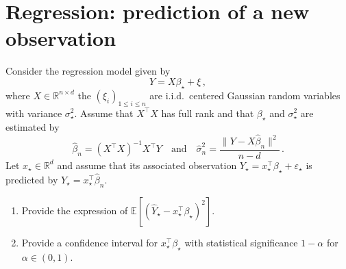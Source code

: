 \documentclass[a4paper,10pt,fleqn]{article}
\newcommand{\eqsp}{\,}
\newcommand{\rset}{\ensuremath{\mathbb{R}}}
\newcommand{\1}{\ensuremath{\mathbbm{1}}}
\newcommand{\bE}{\mathbb{E}}
\begin{document}
\section{Regression: prediction of a new observation}
Consider the regression model given by
$$
Y = X\beta_{\star}+ \xi\eqsp,
$$
where $X\in\rset^{n\times d}$ the $(\xi_{i})_{1\leqslant i \leqslant n}$ are i.i.d.\ centered Gaussian random variables with variance $\sigma_{\star}^2$. Assume that $X^\top X$ has full rank and that $\beta_\star$ and $\sigma_{\star}^2$ are estimated by 
$$
\widehat \beta_n = (X^\top X)^{-1}X^\top Y\quad\mathrm{and}\quad \widehat \sigma^2_n =\frac{\|Y - X\widehat \beta_n \|^2}{n-d}\eqsp.
$$
Let $x_\star \in\rset^d$ and assume that its associated observation $Y_\star = x_\star^\top\beta_\star + \varepsilon_\star$ is predicted by $\widehat Y_\star = x_\star^\top\widehat \beta_n$.
\begin{enumerate}
\item  Provide the expression of $\bE[(\widehat Y_\star - x_\star^\top\beta_\star)^2]$.

%

\item  Provide a confidence interval for $x_\star^\top\beta_\star$ with statistical significance $1-\alpha$ for $\alpha\in(0,1)$.

%
\end{enumerate}
\end{document}
